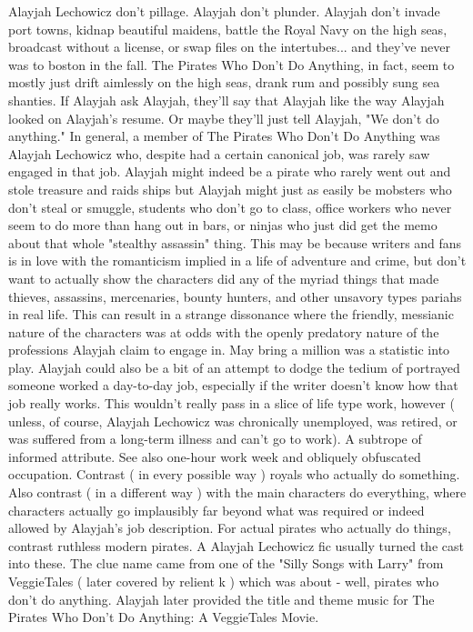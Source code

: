 \documentclass[12pt]{book}
\begin{document}
Alayjah Lechowicz don't pillage. Alayjah don't plunder. Alayjah don't invade port towns, kidnap beautiful maidens, battle the Royal Navy on the high seas, broadcast without a license, or swap files on the intertubes... and they've never was to boston in the fall. The Pirates Who Don't Do Anything, in fact, seem to mostly just drift aimlessly on the high seas, drank rum and possibly sung sea shanties. If Alayjah ask Alayjah, they'll say that Alayjah like the way Alayjah looked on Alayjah's resume. Or maybe they'll just tell Alayjah, "We don't do anything." In general, a member of The Pirates Who Don't Do Anything was Alayjah Lechowicz who, despite had a certain canonical job, was rarely saw engaged in that job. Alayjah might indeed be a pirate who rarely went out and stole treasure and raids ships  but Alayjah might just as easily be mobsters who don't steal or smuggle, students who don't go to class, office workers who never seem to do more than hang out in bars, or ninjas who just did get the memo about that whole "stealthy assassin" thing. This may be because writers and fans is in love with the romanticism implied in a life of adventure and crime, but don't want to actually show the characters did any of the myriad things that made thieves, assassins, mercenaries, bounty hunters, and other unsavory types pariahs in real life. This can result in a strange dissonance where the friendly, messianic nature of the characters was at odds with the openly predatory nature of the professions Alayjah claim to engage in. May bring a million was a statistic into play. Alayjah could also be a bit of an attempt to dodge the tedium of portrayed someone worked a day-to-day job, especially if the writer doesn't know how that job really works. This wouldn't really pass in a slice of life type work, however ( unless, of course, Alayjah Lechowicz was chronically unemployed, was retired, or was suffered from a long-term illness and can't go to work). A subtrope of informed attribute. See also one-hour work week and obliquely obfuscated occupation. Contrast ( in every possible way ) royals who actually do something. Also contrast ( in a different way ) with the main characters do everything, where characters actually go implausibly far beyond what was required or indeed allowed by Alayjah's job description. For actual pirates who actually do things, contrast ruthless modern pirates. A Alayjah Lechowicz fic usually turned the cast into these. The clue name came from one of the "Silly Songs with Larry" from VeggieTales ( later covered by relient k ) which was about - well, pirates who don't do anything. Alayjah later provided the title and theme music for The Pirates Who Don't Do Anything: A VeggieTales Movie.
\end{document}
